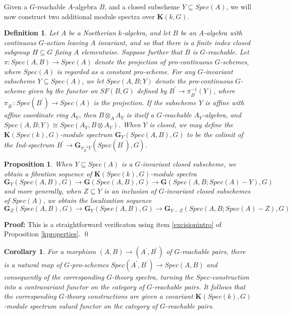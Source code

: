 \documentclass[11pt]{article}
\def \bK{\mathbf K}
\newcommand\mfk{\mathbf G}
\newtheorem{Proposition}{Proposition}[section]
\newtheorem{Definition}{Definition}[section]
\newtheorem{Corollary}{Corollary}[section]
\newenvironment{Proof}{\par\noindent\textbf{Proof:}}
{\qed}
\begin{document}
Given a $G$-reachable $A$-algebra $B$, and a closed subscheme $Y \subseteq Spec(A)$, we will now construct two additional module spectra over $\bK(k,G)$.   

\begin{Definition} \label{pullbackschemes}
    Let $A$ be a Noetherian $k$-algebra, and let $B$ be an $A$-algebra with continuous $G$-action leaving $A$ invariant, and so that there is a finite index closed subgroup $H \subseteq G $ fixing $A$ elementwise.  Suppose further that $B$ is  $G$-reachable. Let $\pi :Spec(A,B) \rightarrow Spec(A) $ denote the projection of pro-continuous $G$-schemes, where $Spec(A)$ is regarded as a constant pro-scheme.   For any $G$-invariant subscheme $Y \subseteq Spec(A)$, we let $Spec(A,B; Y)$ denote the pro-continuous $G$-scheme given by the functor on $SF(B,G) $ defined  by $B^{\prime} \rightarrow \pi _{B^{\prime}}^{-1}(Y)$, where $\pi _{B^{\prime}}: Spec(B^{\prime}) \rightarrow Spec(A)$ is the projection. If the subscheme $Y$ is affine with affine coordinate ring $A_Y$,  then $B \otimes _{A} A_Y$ is itself a $G$-reachable  $A_Y$-algebra, and $Spec^{}(A,B; Y) \cong Spec(A_Y, B \otimes  A_Y)$.  When $Y$ is closed, we may define  the $\bK(Spec(k),G)$-module spectrum $\mfk _{Y} (Spec(A, B),G)$ to be the colimit of the  Ind-spectrum $B^{\prime} \rightarrow \mfk_{\pi ^{-1}_{B^{\prime}}Y}(Spec(B^{\prime}), G)$. 
    \end{Definition}

\begin{Proposition} \label{pullbacklocalization}
When $Y \subseteq Spec(A)$ is a $G$-invariant closed subscheme,  we obtain a fibration  sequence of $\bK (Spec(k),G)$-module spectra 
$$ \mfk_{Y}(Spec(A, B),G) \rightarrow \mfk (Spec(A, B),G) \rightarrow \mfk(Spec(A,B; Spec(A) - Y),G) 
$$
and more generally, when $Z \subseteq Y$ is an inclusion of $G$-invariant closed subschemes of $Spec(A)$, we obtain the localization sequence 
$$ \mfk_{Z}(Spec(A, B),G) \rightarrow \mfk_Y(Spec(A, B),G) \rightarrow \mfk_{Y-Z}(Spec (A, B ; Spec(A)-Z),G) 
$$
\end{Proposition}
\begin{Proof}
    This is a straightforward verificaton using item \ref{excisionintro} of Proposition \ref{kproperties}. 
\end{Proof}

    
  
        
   \begin{Corollary}\label{pairfunctoriality}
       For a morphism $(A,B) \rightarrow (A^{\prime},B^{\prime})$ of $G$-reachable pairs, there is a natural map of $G$-pro-schemes $Spec(A^{\prime}, B^{\prime}) \rightarrow Spec(A, B)$ and consequently of the corresponding $G$-theory spectra, turning the $Spec$-construction into a contravariant functor on the category of $G$-reachable pairs.  It follows that the corresponding $G$-theory constructions are given a covariant $\bK(Spec(k),G) $-module spectrum valued functor on the category of $G$-reachable pairs.  
   \end{Corollary}
       
\end{document}
